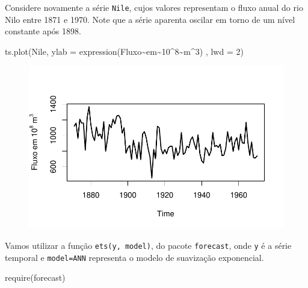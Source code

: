 \documentclass[
  letterpaper,
  DIV=11,
  numbers=noendperiod]{scrreprt}
\newenvironment{Shaded}{\begin{snugshade}}{\end{snugshade}}
\newcommand{\AttributeTok}[1]{\textcolor[rgb]{0.40,0.45,0.13}{#1}}
\newcommand{\DecValTok}[1]{\textcolor[rgb]{0.68,0.00,0.00}{#1}}
\newcommand{\FunctionTok}[1]{\textcolor[rgb]{0.28,0.35,0.67}{#1}}
\newcommand{\NormalTok}[1]{\textcolor[rgb]{0.00,0.23,0.31}{#1}}
\newcommand{\SpecialCharTok}[1]{\textcolor[rgb]{0.37,0.37,0.37}{#1}}
\theoremstyle{definition}
\theoremstyle{plain}
\theoremstyle{definition}
\theoremstyle{plain}
\theoremstyle{remark}
\begin{document}
Considere novamente a série \texttt{Nile}, cujos valores representam o
fluxo anual do rio Nilo entre 1871 e 1970. Note que a série aparenta
oscilar em torno de um nível constante após 1898.

\begin{Shaded}
\begin{Highlighting}[]
\FunctionTok{ts.plot}\NormalTok{(Nile, }\AttributeTok{ylab =} \FunctionTok{expression}\NormalTok{(Fluxo}\SpecialCharTok{\textasciitilde{}}\NormalTok{em}\SpecialCharTok{\textasciitilde{}}\DecValTok{10}\SpecialCharTok{\^{}}\DecValTok{8}\SpecialCharTok{\textasciitilde{}}\NormalTok{m}\SpecialCharTok{\^{}}\DecValTok{3}\NormalTok{) , }\AttributeTok{lwd =} \DecValTok{2}\NormalTok{)}
\end{Highlighting}
\end{Shaded}

\begin{figure}[H]

{\centering \includegraphics{suave_exponencial_files/figure-pdf/unnamed-chunk-1-1.pdf}

}

\end{figure}

Vamos utilizar a função \texttt{ets(y,\ model)}, do pacote
\texttt{forecast}, onde \texttt{y} é a série temporal e
\texttt{model=\textquotesingle{}ANN\textquotesingle{}} representa o
modelo de suavização exponencial.

\begin{Shaded}
\begin{Highlighting}[]
\FunctionTok{require}\NormalTok{(forecast)}
\end{Highlighting}
\end{Shaded}
\end{document}
